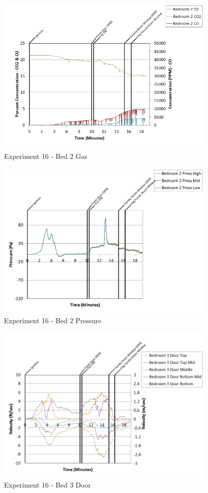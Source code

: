 \documentclass{article}
\begin{document}
\begin{appendices}
\begin{figure}[h!]
	\centering
	\includegraphics[height=3.05in]{0_Images/Results_Charts/Exp_16_Charts/Bed2Gas.png}
	\caption{Experiment 16 - Bed 2 Gas}
\end{figure}

\clearpage

\begin{figure}[h!]
	\centering
	\includegraphics[height=3.05in]{0_Images/Results_Charts/Exp_16_Charts/Bed2Pressure.png}
	\caption{Experiment 16 - Bed 2 Pressure}
\end{figure}


\begin{figure}[h!]
	\centering
	\includegraphics[height=3.05in]{0_Images/Results_Charts/Exp_16_Charts/Bed3Door.png}
	\caption{Experiment 16 - Bed 3 Door}
\end{figure}


\end{appendices}
\end{document}
